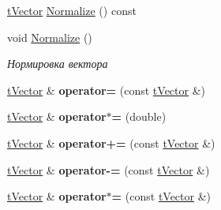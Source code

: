 \begin{DoxyCompactItemize}
\hyperlink{classtVector}{t\+Vector} \hyperlink{classtVector_a6141302c1bbad21b64e56d93ed0408e5}{Normalize} () const
\item 
\mbox{\label{classtVector_a95d4d2975910e568033bd2a9d7df9c02}} 
void \hyperlink{classtVector_a95d4d2975910e568033bd2a9d7df9c02}{Normalize} ()
\begin{DoxyCompactList}\small\item\em Нормировка вектора \end{DoxyCompactList}\item 
\mbox{\label{classtVector_accdeac1e568168edc72c3061f3f2c144}} 
\hyperlink{classtVector}{t\+Vector} \& {\bfseries operator=} (const \hyperlink{classtVector}{t\+Vector} \&)
\item 
\mbox{\label{classtVector_a15ace59ebe89a3d155a37dff222edfa0}} 
\hyperlink{classtVector}{t\+Vector} \& {\bfseries operator$\ast$=} (double)
\item 
\mbox{\label{classtVector_ace7606b4086cef0c8522a94f43c0ceb4}} 
\hyperlink{classtVector}{t\+Vector} \& {\bfseries operator+=} (const \hyperlink{classtVector}{t\+Vector} \&)
\item 
\mbox{\label{classtVector_a81439447bad6a912c1e40be8ce5560bb}} 
\hyperlink{classtVector}{t\+Vector} \& {\bfseries operator-\/=} (const \hyperlink{classtVector}{t\+Vector} \&)
\item 
\mbox{\label{classtVector_af49e6ba860ee5c38c66ae13f0c9c653f}} 
\hyperlink{classtVector}{t\+Vector} \& {\bfseries operator$\ast$=} (const \hyperlink{classtVector}{t\+Vector} \&)
\end{DoxyCompactItemize}
